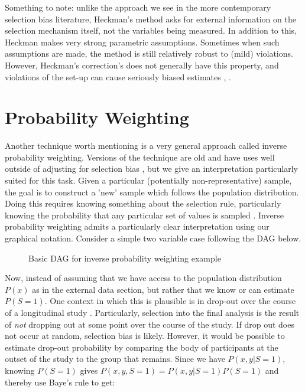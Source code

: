 \documentclass[12pt,twoside]{reedthesis}
\theoremstyle{definition}
\begin{document}
Something to note: unlike the approach we see in the more contemporary selection bias literature, Heckman's method asks for external information on the selection mechanism itself, not the variables being measured. In addition to this, Heckman makes very strong parametric assumptions. Sometimes when such assumptions are made, the method is still relatively robust to (mild) violations.  However, Heckman's correction's does not generally have this property, and violations of the set-up can cause seriously biased estimates \citep{Little_1986}, \citep{Bushway_2007}. 


\section{Probability Weighting}

Another technique worth mentioning is a very general approach called inverse probability weighting. Versions of the technique are old  and have uses well outside of adjusting for selection bias \citep{Horvitz_1952}, but we give an interpretation particularly suited for this task. Given a particular (potentially non-representative) sample, the goal is to construct a 'new' sample which follows the population distribution. Doing this requires knowing something about the selection rule, particularly knowing the probability that any particular set of values is sampled \cite{Cortes_2008}. Inverse probability weighting admits a particularly clear interpretation using our graphical notation. Consider a simple two variable case following the DAG below.
\begin{figure}[H]
\begin{center}
\end{center}
\caption{Basic DAG for inverse probability weighting example}
\end{figure}


Now, instead of assuming that we have access to the population distribution $P(x)$ as in the external data section, but rather that we know or can estimate  $P(S = 1)$.  One context in which this is plausible is in drop-out over the course of a longitudinal study \citep{Hernan_2004}. Particularly, selection into the final analysis is the result of \emph{not} dropping out at some point over the course of the study. If drop out does not occur at random, selection bias is likely. However, it would be possible to estimate drop-out probability by comparing the body of participants at the outset of the study to the group that remains. Since we have $P(x,y | S = 1)$, knowing $P(S = 1)$ gives $P(x,y, S = 1) = P(x,y | S = 1)P(S = 1)$ and thereby use Baye's rule to get:
\end{document}
